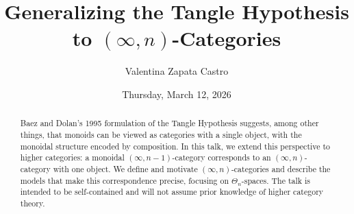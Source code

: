 \documentclass{UAmathtalk}
\author{Valentina Zapata Castro}
\title{Generalizing the Tangle Hypothesis to \texorpdfstring{$(\infty,n)$}{(∞,n)}-Categories}
\date{Thursday, March 12, 2026}
\begin{document}
\maketitle

\begin{abstract}
Baez and Dolan’s 1995 formulation of the Tangle Hypothesis suggests, among other things, that monoids can be viewed as categories with a single object, with the monoidal structure encoded by composition. In this talk, we extend this perspective to higher categories: a monoidal $(\infty,n-1)$-category corresponds to an $(\infty,n)$-category with one object. We define and motivate $(\infty,n)$-categories and describe the models that make this correspondence precise, focusing on $\Theta_n$-spaces. The talk is intended to be self-contained and will not assume prior knowledge of higher category theory.
\end{abstract}
\end{document}
